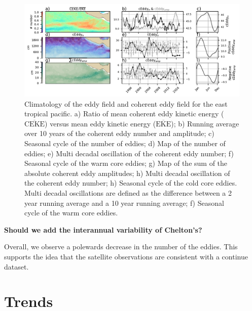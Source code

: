 \documentclass[draft,linenumbers]{agujournal2019}
\newcommand{\MEKE}{\overline{\textrm{EKE}}}
\newcommand{\MCEKE}{\overline{\textrm{CEKE}}}
\begin{document}
	\begin{figure}
	    \centering
	    \includegraphics[width=1\textwidth]{figures/regional_ratios_and_stats_V2_3.pdf}
	    \caption{Climatology of the eddy field and coherent eddy field for the east tropical pacific. a) Ratio of mean coherent eddy kinetic energy ($\MCEKE$) versus mean eddy kinetic energy ($\MEKE$); b) Running average over 10 years of the coherent eddy number and amplitude; c) Seasonal cycle of the number of eddies; d) Map of the number of eddies; 
		e) Multi decadal oscillation of the coherent eddy number; f) Seasonal cycle of the warm core eddies; g) Map of the sum of the absolute coherent eddy amplitudes;  h) Multi decadal oscillation of the coherent eddy number; h) Seasonal cycle of the cold core eddies. Multi decadal oscillations are defined as the difference between a 2 year running average and a 10 year running average; f) Seasonal cycle of the warm core eddies.}
	    \label{fig:south_atlantic_cycle}
	\end{figure}

	\textbf{Should we add the interannual variability of Chelton's?}

	Overall, we observe a polewards decrease in the number of the eddies. This supports the idea that the satellite observations are consistent with a continue dataset.




	\section{Trends}
\end{document}
